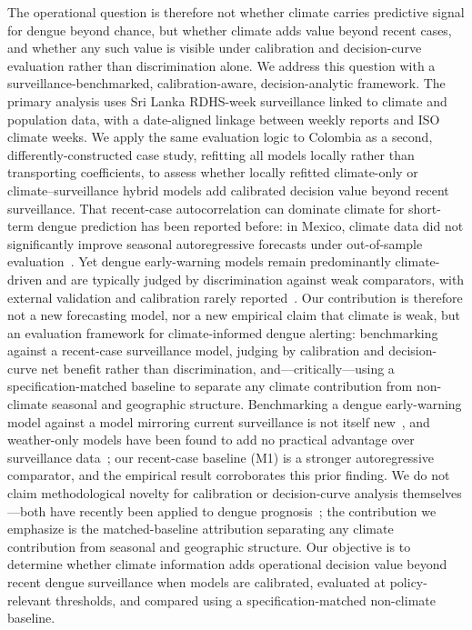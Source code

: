 \documentclass[11pt,a4paper]{article}
\begin{document}
The operational question is therefore not whether climate carries predictive signal for dengue beyond chance, but whether climate adds value beyond recent cases, and whether any such value is visible under calibration and decision-curve evaluation rather than discrimination alone. We address this question with a surveillance-benchmarked, calibration-aware, decision-analytic framework. The primary analysis uses Sri Lanka RDHS-week surveillance linked to climate and population data, with a date-aligned linkage between weekly reports and ISO climate weeks. We apply the same evaluation logic to Colombia as a second, differently-constructed case study, refitting all models locally rather than transporting coefficients, to assess whether locally refitted climate-only or climate--surveillance hybrid models add calibrated decision value beyond recent surveillance. That recent-case autocorrelation can dominate climate for short-term dengue prediction has been reported before: in Mexico, climate data did not significantly improve seasonal autoregressive forecasts under out-of-sample evaluation~\cite{Johansson2016}. Yet dengue early-warning models remain predominantly climate-driven and are typically judged by discrimination against weak comparators, with external validation and calibration rarely reported~\cite{Leung2022,HussainAlkhateeb2021}. Our contribution is therefore not a new forecasting model, nor a new empirical claim that climate is weak, but an evaluation framework for climate-informed dengue alerting: benchmarking against a recent-case surveillance model, judging by calibration and decision-curve net benefit rather than discrimination, and---critically---using a specification-matched baseline to separate any climate contribution from non-climate seasonal and geographic structure. Benchmarking a dengue early-warning model against a model mirroring current surveillance is not itself new~\cite{Lowe2013}, and weather-only models have been found to add no practical advantage over surveillance data~\cite{Benedum2020}; our recent-case baseline (M1) is a stronger autoregressive comparator, and the empirical result corroborates this prior finding. We do not claim methodological novelty for calibration or decision-curve analysis themselves---both have recently been applied to dengue prognosis~\cite{Sangkaew2026}; the contribution we emphasize is the matched-baseline attribution separating any climate contribution from seasonal and geographic structure. Our objective is to determine whether climate information adds operational decision value beyond recent dengue surveillance when models are calibrated, evaluated at policy-relevant thresholds, and compared using a specification-matched non-climate baseline.
\end{document}
